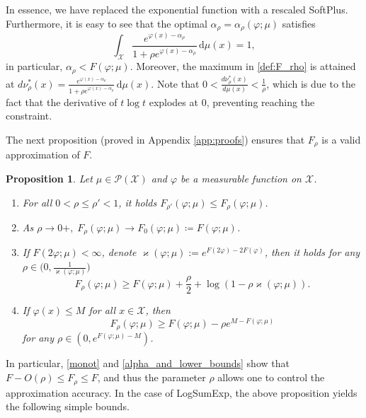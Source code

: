 \documentclass{article}
\newcommand{\dd}{\,\mathrm{d}}
\newcommand{\Pspace}{\mathcal{P}}
\newcommand*{\eqset}{\coloneqq}
\def\cX{\mathcal{X}}
\theoremstyle{plain}
\newtheorem{proposition}[theorem]{Proposition}
\theoremstyle{definition}
\theoremstyle{remark}
\begin{document}
In essence, we have replaced the exponential function with a rescaled SoftPlus. 
Furthermore, it is easy to see that the optimal $\alpha_{\rho} = \alpha_{\rho}(\varphi;\mu)$ satisfies
\begin{equation}\label{eq:opt_alpha_rho}
    \int_{\cX} \frac{e^{\varphi(x) - \alpha_{\rho}}}{1 + \rho e^{\varphi(x) - \alpha_{\rho}}} \dd \mu(x) = 1 ,
\end{equation}
in particular, $\alpha_{\rho} < F(\varphi; \mu)$.
Moreover, the maximum in \eqref{def:F_rho} is attained at
$\displaystyle d \nu^*_\rho(x) = \frac{e^{\varphi(x) - \alpha_{\rho}}}{1 + \rho e^{\varphi(x) - \alpha_{\rho}}} \dd \mu(x)$.
Note that $0 < \frac{d \nu^*_\rho(x)}{d \mu(x)} < \frac{1}{\rho}$, which is due to the fact that the derivative of $t \log t$ explodes at $0$, preventing reaching the constraint.

The next proposition (proved in Appendix \ref{app:proofs}) ensures that $F_\rho$ is a valid approximation of $F$. 

\begin{proposition}\label{prop:approx}
    Let $\mu \in \Pspace(\cX)$ and $\varphi$ be a measurable function on $\cX$.
    \begin{enumerate}[label=(\roman*),noitemsep,nolistsep,leftmargin=*]
    \item\label{monot} For all $0 < \rho \le \rho' < 1$, it holds $F_{\rho'}(\varphi ; \mu) \le F_\rho(\varphi ; \mu)$.
    \item\label{lim} As $\rho \to 0+,\; F_\rho(\varphi ; \mu) \to F_0(\varphi ; \mu) \eqset F(\varphi ; \mu)$.
    \item\label{alpha_and_lower_bounds} If $F(2 \varphi; \mu) < \infty$, denote $\varkappa(\varphi ; \mu):=e^{F(2\varphi) - 2F(\varphi)}$, then it holds for any $\rho \in \bigl(0,\frac{1}{\varkappa(\varphi ; \mu)}\bigr)$
    \begin{equation}\label{eq:lower_bound}
        F_\rho(\varphi ; \mu) \ge F(\varphi; \mu) + \frac{\rho}{2} +\log(1-\rho \varkappa(\varphi ; \mu)) .
    \end{equation}
    \item\label{lower_bound_with_max} If $\varphi(x) \le M$ for all $x \in \cX$, then $$F_\rho(\varphi ; \mu) \ge F(\varphi; \mu) - \rho e^{M - F(\varphi; \mu)}$$ for any $\rho \in \left( 0, e^{F(\varphi; \mu) - M} \right)$.
    \end{enumerate}
\end{proposition}


In particular, \ref{monot} and \ref{alpha_and_lower_bounds} show that $F - O(\rho) \le F_{\rho} \le F$, and thus the parameter $\rho$ allows one to control the approximation accuracy. 
In the case of LogSumExp, the above proposition yields the following simple bounds.
\end{document}
